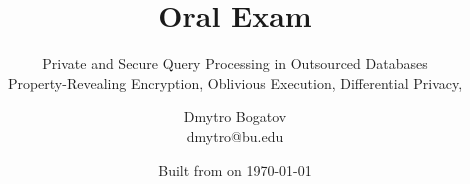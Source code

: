 \title{Oral Exam}

\subtitle{
	Private and Secure Query Processing in Outsourced Databases \\
	{\small Property-Revealing Encryption, Oblivious Execution, Differential Privacy, \epsolute{}}
}

\date{Built from \href{https://git.dbogatov.org/bu/oral-exam/commit/\version}{\emph{\version}} on \today}

\author{Dmytro Bogatov \\ dmytro@bu.edu}


\def\wm{\begin{tabular}{c} Dmytro Bogatov \\ Boston University \end{tabular}}
